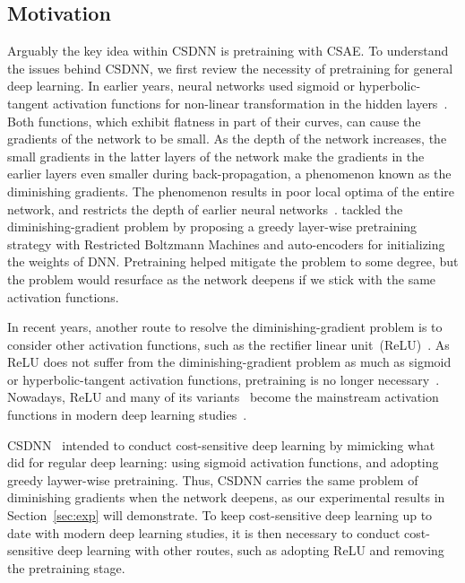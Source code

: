 \documentclass[a4paper]{article}
\begin{document}
\subsection{Motivation}
  \label{sec:drawbacks}
  Arguably the key idea within CSDNN is pretraining with CSAE.
  To understand the issues behind CSDNN, we first review the necessity of pretraining for general deep learning.
  In earlier years, neural networks used sigmoid or hyperbolic-tangent activation functions for non-linear transformation in the hidden layers~\cite{dayhoff1990intro,lawrence1997face,hinton2006fast,bengio2009learning}.
  Both functions, which exhibit flatness in part of their curves, can cause the gradients of the network to be small.
  As the depth of the network increases, the small gradients in the latter layers of the network make the gradients in the earlier layers even smaller during back-propagation, a phenomenon known as the diminishing gradients.
  The phenomenon results in poor local optima of the entire network, and restricts the depth of earlier neural networks~\cite{michael2015nndl}.
  \cite{hinton2006fast,bengio2009learning} tackled the diminishing-gradient problem by proposing a greedy layer-wise pretraining strategy with Restricted Boltzmann Machines and auto-encoders for initializing the weights of DNN.
  Pretraining helped mitigate the problem to some degree, but the problem would resurface as the network deepens if we stick with the same activation functions.

  In recent years, another route to resolve the diminishing-gradient problem is to consider other activation functions, such as the rectifier linear unit~(ReLU)~\cite{nair2010rectified}.
  As ReLU does not suffer from the diminishing-gradient problem as much as sigmoid or hyperbolic-tangent activation functions, pretraining is no longer necessary~\cite{glorot2011deep}.
  Nowadays, ReLU and many of its variants~\cite{xu2015empirical,he2015delving} become the mainstream activation functions in modern deep learning studies~\cite{maas2013rectifier,he2015deep}.

  CSDNN~\cite{YC2016} intended to conduct cost-sensitive deep learning by mimicking what~\cite{bengio2009learning} did for regular deep learning: using sigmoid activation functions, and adopting greedy laywer-wise pretraining.
  Thus, CSDNN carries the same problem of diminishing gradients when the network deepens, as our experimental results in Section~\ref{sec:exp} will demonstrate.
  To keep cost-sensitive deep learning up to date with modern deep learning studies, it is then necessary to conduct cost-sensitive deep learning with other routes, such as adopting ReLU and removing the pretraining stage.
\end{document}
